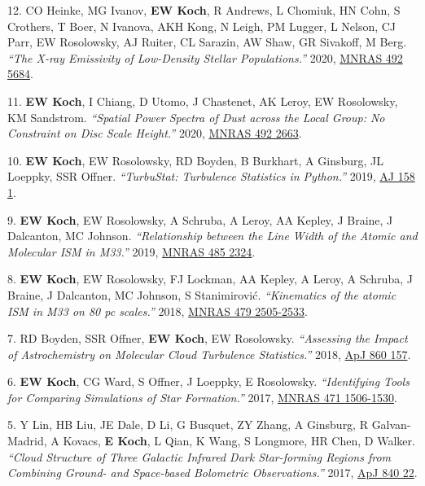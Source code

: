 \documentclass[letterpaper,11pt]{article}
\newenvironment{publist}{
  \begingroup
  \raggedright
  \begin{description}[leftmargin=4ex,style=sameline]
}{
  \end{description}
  \endgroup
}
\begin{document}
\begin{publist}
\item[12.] CO Heinke, MG Ivanov, \textbf{EW Koch}, R Andrews, L Chomiuk, HN Cohn, S Crothers, T Boer, N Ivanova, AKH Kong, N Leigh, PM Lugger, L Nelson, CJ Parr, EW Rosolowsky, AJ Ruiter, CL Sarazin, AW Shaw, GR Sivakoff, M Berg. \textit{``The X-ray Emissivity of Low-Density Stellar Populations.''} 2020, \href{http://adsabs.harvard.edu/abs/2020MNRAS.492.5684H}{MNRAS 492 5684}.
\item[11.] \textbf{EW Koch}, I Chiang, D Utomo, J Chastenet, AK Leroy, EW Rosolowsky, KM Sandstrom. \textit{``Spatial Power Spectra of Dust across the Local Group: No Constraint on Disc Scale Height.''} 2020, \href{http://adsabs.harvard.edu/abs/2020MNRAS.492.2663K}{MNRAS 492 2663}.
\item[10.] \textbf{EW Koch}, EW Rosolowsky, RD Boyden, B Burkhart, A Ginsburg, JL Loeppky, SSR Offner. \textit{``TurbuStat: Turbulence Statistics in Python.''} 2019, \href{http://adsabs.harvard.edu/abs/2019AJ....158....1K}{AJ 158 1}.
\item[9.] \textbf{EW Koch}, EW Rosolowsky, A Schruba, A Leroy, AA Kepley, J Braine, J Dalcanton, MC Johnson. \textit{``Relationship between the Line Width of the Atomic and Molecular ISM in M33.''} 2019, \href{http://adsabs.harvard.edu/abs/2019MNRAS.485.2324K}{MNRAS 485 2324}.
\item[8.] \textbf{EW Koch}, EW Rosolowsky, FJ Lockman, AA Kepley, A Leroy, A Schruba, J Braine, J Dalcanton, MC Johnson, S Stanimirovi\'{c}. \textit{``Kinematics of the atomic ISM in M33 on 80 pc scales.''} 2018, \href{http://adsabs.harvard.edu/abs/2018MNRAS.479.2505K}{MNRAS 479 2505-2533}.
\item[7.] RD Boyden, SSR Offner, \textbf{EW Koch}, EW Rosolowsky. \textit{``Assessing the Impact of Astrochemistry on Molecular Cloud Turbulence Statistics.''} 2018, \href{http://adsabs.harvard.edu/abs/2018ApJ...860..157B}{ApJ 860 157}.
\item[6.] \textbf{EW Koch}, CG Ward, S Offner, J Loeppky, E Rosolowsky. \textit{``Identifying Tools for Comparing Simulations of Star Formation.''} 2017, \href{http://adsabs.harvard.edu/abs/2017MNRAS.471.1506K}{MNRAS 471 1506-1530}.
\item[5.] Y Lin, HB Liu, JE Dale, D Li, G Busquet, ZY Zhang, A Ginsburg, R Galvan-Madrid, A Kovacs, \textbf{E Koch}, L Qian, K Wang, S Longmore, HR Chen, D Walker. \textit{``Cloud Structure of Three Galactic Infrared Dark Star-forming Regions from Combining Ground- and Space-based Bolometric Observations.''} 2017, \href{http://adsabs.harvard.edu/abs/2017ApJ...840...22L}{ApJ 840 22}.

\end{publist}
\end{document}
